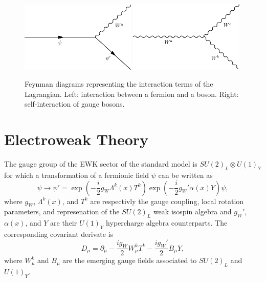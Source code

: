     \begin{figure}[h!]
      \centering
      \includegraphics[width=0.49\textwidth]{img/I-1-standard-model/diagram-fermion-boson.png}
      \includegraphics[width=0.49\textwidth]{img/I-1-standard-model/diagram-boson-boson.png}
      \caption{Feynman diagrams representing the interaction terms of the Lagrangian. Left: interaction between a fermion and a boson. Right: self-interaction of gauge bosons.}
      \label{fig:I-1-diagram}
    \end{figure}

  \section{Electroweak Theory}

    The gauge group of the EWK sector of the standard model is $ SU(2)_L \otimes U(1)_Y $ for which a transformation of a fermionic field $ \psi $ can be written as
    \begin{equation}
      \psi \rightarrow \psi' = \exp\left(- \frac{i}{2} g_W \Lambda^k(x) T^k \right) \exp\left(- \frac{i}{2} g_W' \alpha(x) Y \right) \psi ,
    \end{equation}
    where $ g_W $, $ \Lambda^k(x) $, and $ T^k $ are respectivly the gauge coupling, local rotation parameters, and represenation of the $ SU(2)_L $ weak isospin algebra and $ g_W' $, $ \alpha(x) $, and $ Y $ are their $ U(1)_Y $ hypercharge algebra counterparts. The corresponding covariant derivate is
    \begin{equation}
      D_\mu = \partial_\mu - \frac{i g_W}{2} W^k_\mu T^k - \frac{i g_W'}{2} B_\mu Y ,
    \end{equation}
    where $ W^k_\mu $ and $ B_\mu$ are the emerging gauge fields associated to $ SU(2)_L $ and $ U(1)_Y $. \\

